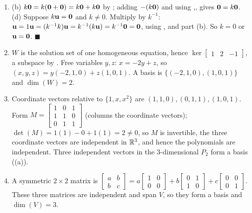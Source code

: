 \begin{enumerate}[label=\textbf{3.\arabic*},leftmargin=2.6em,itemsep=8pt]

\item (b) $k\mathbf{0}=k(\mathbf{0}+\mathbf{0})=k\mathbf{0}+k\mathbf{0}$ by ; adding $-(k\mathbf{0})$ and using ,, gives $\mathbf{0}=k\mathbf{0}$. (d) Suppose $k\mathbf{u}=\mathbf{0}$ and $k\neq0$. Multiply by $k^{-1}$: $\mathbf{u}=1\mathbf{u}=(k^{-1}k)\mathbf{u}=k^{-1}(k\mathbf{u})=k^{-1}\mathbf{0}=\mathbf{0}$, using , and part (b). So $k=0$ or $\mathbf{u}=\mathbf{0}$. $\blacksquare$

\item $W$ is the solution set of one homogeneous equation, hence $\ker\!\left[\begin{smallmatrix}1&2&-1\end{smallmatrix}\right]$, a subspace by . Free variables $y,z$: $x=-2y+z$, so $(x,y,z)=y(-2,1,0)+z(1,0,1)$. A basis is $\{(-2,1,0),(1,0,1)\}$ and $\dim(W)=2$.

\item Coordinate vectors relative to $\{1,x,x^2\}$ are $(1,1,0),(0,1,1),(1,0,1)$. Form $M=\left[\begin{smallmatrix}1&0&1\\1&1&0\\0&1&1\end{smallmatrix}\right]$ (columns the coordinate vectors); $\det(M)=1(1)-0+1(1)=2\neq0$, so $M$ is invertible, the three coordinate vectors are independent in $\mathbb{R}^3$, and hence the polynomials are independent. Three independent vectors in the $3$-dimensional $P_2$ form a basis ((a)). \checkmark

\item A symmetric $2\times2$ matrix is $\left[\begin{smallmatrix}a&b\\b&c\end{smallmatrix}\right]=a\left[\begin{smallmatrix}1&0\\0&0\end{smallmatrix}\right]+b\left[\begin{smallmatrix}0&1\\1&0\end{smallmatrix}\right]+c\left[\begin{smallmatrix}0&0\\0&1\end{smallmatrix}\right]$. These three matrices are independent and span $V$, so they form a basis and $\dim(V)=3$.


\end{enumerate}
